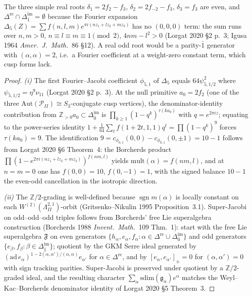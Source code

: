 \begin{proposition}
\begin{enumerate}
 The three simple real roots $\delta_1=2f_2-f_3,\,\delta_2=2f_{-2}-f_3,\,
 \delta_3=f_3$ are even, and $\Delta^{\mathrm{re}}\cap
 \Delta^{\mathrm{im}}_{\bar 1}=\emptyset$ because the Fourier
 expansion
 $\Delta_5(Z)=\sum f(n,l,m) e^{\pi i(n z_1+l z_2+m z_3)}$
 has no $(0,0,0)$ term: the sum runs over $n,m>0$, $n\equiv l\equiv m\equiv 1\pmod 2$,
 $4nm-l^2>0$ (Lorgat 2020 §2 p.~3; Igusa 1964 \emph{Amer.~J.~Math.}~86 §12).
 A real odd root would be a parity-$\bar 1$ generator with
 $(\alpha,\alpha)=2$, i.e.\ a Fourier coefficient at a weight-zero
 constant term, which cusp forms lack.
\end{enumerate}
\end{proposition}

\begin{proof}
\emph{(i)} The first Fourier--Jacobi coefficient $\phi_{5,1}$ of $\Delta_5$
equals $64\psi_{5,1/2}^2$ where $\psi_{5,1/2}=\eta^9\nu_{11}$
(Lorgat 2020 §2 p.~3). At the null primitive $a_0=2f_2$ (one of the
three $\mathrm{Aut}(\mathcal P_{II})\cong S_3$-conjugate cusp vertices),
the denominator-identity contribution from
$\mathbb Z_{>0} a_0\subset\Delta^{\mathrm{im}}_{\bar 0}$ is
$\prod_{k\geq 1}(1-q^k)^{\tau(k a_0)}$ with $q=e^{2\pi i z}$; equating
to the power-series identity
$1+\tfrac{1}{64}\sum_t f(1+2t,1,1) q^t=\prod(1-q^k)^9$
forces $\tau(k a_0)=9$. The identification
$9=c_{\phi_{0,1}}(0,0)-c_{\phi_{0,1}}(0,\pm 1)=10-1$ follows from
Lorgat 2020 §6 Theorem~4: the Borcherds product
$\prod(1-e^{2\pi i(n z_1+l z_2+m z_3)})^{f(nm,l)}$ yields
$\mathrm{mult}(\alpha)=f(nm,l)$, and at $n=m=0$ one has $f(0,0)=10$,
$f(0,-1)=1$, with the signed balance $10-1$ the even-odd cancellation
in the isotropic direction.

\emph{(ii)} The $\mathbb Z/2$-grading is well-defined because
$\operatorname{sgn} m(\alpha)$ is locally constant on each
$W^{(2)}(\Lambda^{2,1}_{II})$-orbit (Gritsenko--Nikulin 1995
Proposition~3.1). Super-Jacobi on odd--odd--odd triples follows from
Borcherds' free Lie superalgebra construction (Borcherds 1988
\emph{Invent.~Math.}~109 Thm.~1): start with the free Lie superalgebra
$\mathfrak F$ on even generators
$\{h_\alpha,e_\alpha,f_\alpha:\alpha\in\Delta^{\mathrm{re}}\cup
\Delta^{\mathrm{im}}_{\bar 0}\}$ and odd generators
$\{e_\beta,f_\beta:\beta\in\Delta^{\mathrm{im}}_{\bar 1}\}$;
quotient by the GKM Serre ideal generated by
$(\mathrm{ad}\, e_\alpha)^{1-2(\alpha,\alpha')/(\alpha,\alpha)} e_{\alpha'}$
for $\alpha\in\Delta^{\mathrm{re}}$, and by $[e_\alpha,e_{\alpha'}]_\pm=0$
for $(\alpha,\alpha')=0$ with sign tracking parities. Super-Jacobi is
preserved under quotient by a $\mathbb Z/2$-graded ideal, and the
resulting character
$\sum_\alpha \mathrm{sdim}(\mathfrak g_\alpha) e^\alpha$ matches the
Weyl--Kac--Borcherds denominator identity of Lorgat 2020 §5 Theorem~3.


\end{proof}
